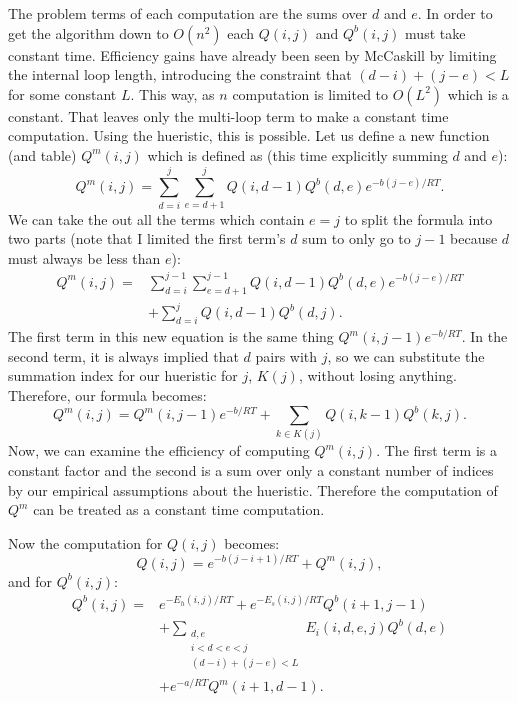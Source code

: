 The problem terms of each computation are the sums over $d$ and
$e$. In order to get the algorithm down to $O(n^2)$ each $Q(i,j)$ and
$Q^b(i,j)$ must take constant time. Efficiency gains have already been
seen by McCaskill by limiting the internal loop length, introducing
the constraint that $(d-i) + (j-e) < L$ for some constant $L$. This
way, as $n$ computation is limited to $O(L^2)$ which is a
constant. That leaves only the multi-loop term to make a constant
time computation. Using the hueristic, this is possible. Let us define
a new function (and table) $Q^m(i, j)$ which is defined as (this time
explicitly summing $d$ and $e$):
\begin{equation}
Q^m(i, j) = \sum_{d = i}^{j}\sum_{e = d+1}^{j} Q(i, d-1)Q^b(d,e)e^{-b(j-e)/RT}.
\end{equation}
We can take the out all the terms which contain $e = j$ to split the
formula into two parts (note that I limited the first term's $d$ sum
to only go to $j-1$ because $d$ must always be less than $e$):
\begin{equation}
\begin{split}
Q^m(i, j) =& \sum_{d = i}^{j-1}\sum_{e = d+1}^{j-1} Q(i, d-1)Q^b(d,e)e^{-b(j-e)/RT} \\
&+ \sum_{d = i}^{j} Q(i, d-1)Q^b(d,j).
\end{split}
\end{equation}
The first term in this new equation is the same thing
$Q^m(i,j-1)e^{-b/RT}$. In the second term, it is always implied that
$d$ pairs with $j$, so we can substitute the summation index for our
hueristic for $j$, $K(j)$, without losing anything. Therefore, our
formula becomes:
\begin{equation}
Q^m(i, j) = Q^m(i, j -1) e^{-b/RT} + \sum_{k \in K(j)} Q(i, k - 1) Q^b(k, j).
\end{equation}
Now, we can examine the efficiency of computing $Q^m(i,j)$. The first
term is a constant factor and the second is a sum over only a constant
number of indices by our empirical assumptions about the
hueristic. Therefore the computation of $Q^m$ can be treated as a
constant time computation.

Now the computation for $Q(i,j)$ becomes:
\begin{equation}
Q(i,j) = e^{-b(j-i+1)/RT} + Q^m(i, j),
\end{equation} 
and for $Q^b(i,j)$:
\begin{equation}
\begin{split}
 Q^b(i, j) =& e^{-E_h(i,j)/RT}+
e^{-E_s(i, j)/RT} Q^b(i+1, j-1) \\ 
& + \sum_{\substack{d,e \\ i < d< e< j\\ (d-i) + (j-e) < L}} E_i(i, d, e, j)Q^b(d,e) \\ 
& + e^{-a/RT}Q^m(i+1, d-1) .
\end{split}
\end{equation}

